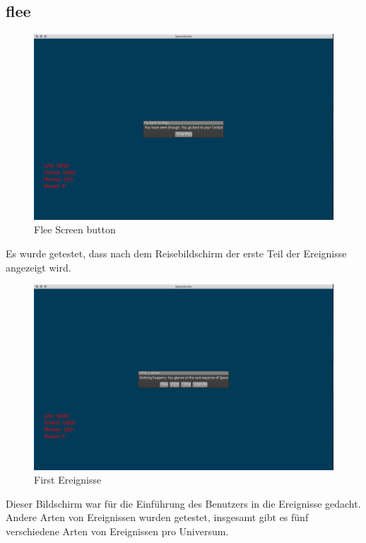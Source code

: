 \documentclass[12pt]{article}
\begin{document}
\subsection{flee}
\begin{figure}[htp]
\centering
\includegraphics[scale=0.4]{TestProtocolBilder/flee.jpg}
\caption{Flee Screen button}
\end{figure}
\newpage
Es wurde getestet, dass nach dem Reisebildschirm der erste Teil der Ereignisse angezeigt wird.\\
\begin{figure}[htp]
\centering
\includegraphics[scale=0.4]{TestProtocolBilder/InitialGeeinisse.jpg}
\caption{First Ereignisse}
\end{figure}
Dieser Bildschirm war für die Einführung des Benutzers in die Ereignisse gedacht.
\newpage
Andere Arten von Ereignissen wurden getestet, insgesamt gibt es fünf verschiedene Arten von Ereignissen pro Universum.
\end{document}
